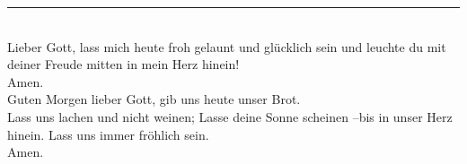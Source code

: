 \par\noindent\rule{\textwidth}{0.4pt}\\ \newline \newline
Lieber Gott, lass mich heute froh gelaunt und glücklich sein und leuchte du mit deiner Freude mitten in mein Herz hinein! \\ \newline
Amen.\\

Guten Morgen lieber Gott, gib uns heute unser Brot.\\ 
Lass uns lachen und nicht weinen; Lasse deine Sonne scheinen –bis in unser Herz hinein. Lass uns immer fröhlich sein. \\ \newline
Amen.\\


